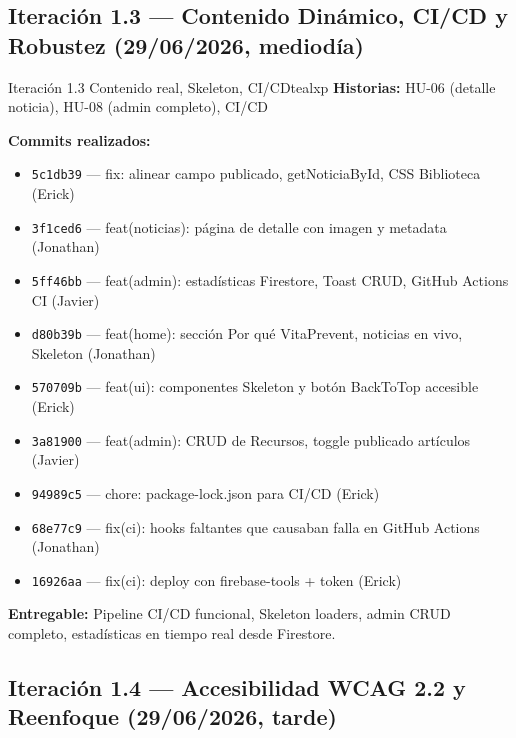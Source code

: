 \documentclass[12pt, a4paper]{article}
\begin{document}
\subsection{Iteración 1.3 --- Contenido Dinámico, CI/CD y Robustez (29/06/2026, mediodía)}

\begin{iterbox}{Iteración 1.3 \quad Contenido real, Skeleton, CI/CD}{tealxp}
\textbf{Historias:} HU-06 (detalle noticia), HU-08 (admin completo), CI/CD

\textbf{Commits realizados:}
\begin{itemize}
  \item \texttt{5c1db39} --- fix: alinear campo publicado, getNoticiaById, CSS Biblioteca (Erick)
  \item \texttt{3f1ced6} --- feat(noticias): página de detalle con imagen y metadata (Jonathan)
  \item \texttt{5ff46bb} --- feat(admin): estadísticas Firestore, Toast CRUD, GitHub Actions CI (Javier)
  \item \texttt{d80b39b} --- feat(home): sección Por qué VitaPrevent, noticias en vivo, Skeleton (Jonathan)
  \item \texttt{570709b} --- feat(ui): componentes Skeleton y botón BackToTop accesible (Erick)
  \item \texttt{3a81900} --- feat(admin): CRUD de Recursos, toggle publicado artículos (Javier)
  \item \texttt{94989c5} --- chore: package-lock.json para CI/CD (Erick)
  \item \texttt{68e77c9} --- fix(ci): hooks faltantes que causaban falla en GitHub Actions (Jonathan)
  \item \texttt{16926aa} --- fix(ci): deploy con firebase-tools + token (Erick)
\end{itemize}

\textbf{Entregable:} Pipeline CI/CD funcional, Skeleton loaders, admin CRUD completo, estadísticas en tiempo real desde Firestore.
\end{iterbox}

\subsection{Iteración 1.4 --- Accesibilidad WCAG 2.2 y Reenfoque (29/06/2026, tarde)}
\end{document}
